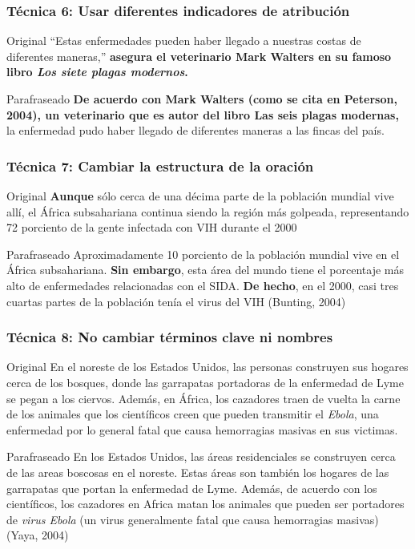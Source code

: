 \documentclass[
11pt, %
]{beamer}
\begin{document}
\begin{frame}
	\frametitle{Técnica 6: Usar diferentes indicadores de atribución}
	\begin{block}{Original}
		``Estas enfermedades pueden haber llegado a nuestras costas de diferentes maneras,'' \textbf{asegura el veterinario Mark Walters en su famoso libro \textit{Los siete plagas modernos}.}
	\end{block}
	\begin{block}{Parafraseado}
		\textbf{De acuerdo con Mark Walters (como se cita en Peterson, 2004), un veterinario que es autor del libro Las seis plagas modernas,} la enfermedad pudo haber llegado de diferentes maneras a las fincas del país.
	\end{block}
\end{frame}


\begin{frame}
	\frametitle{Técnica 7: Cambiar la estructura de la oración}
	\begin{block}{Original}
		\textbf{Aunque} sólo cerca de una décima parte de la población mundial vive allí, el África subsahariana continua siendo la región más golpeada, representando 72 porciento de la gente infectada con VIH durante el 2000
	\end{block}
	\begin{block}{Parafraseado}
		Aproximadamente 10 porciento de la población mundial vive en el África subsahariana. \textbf{Sin embargo}, esta área del mundo tiene el porcentaje más alto de enfermedades relacionadas con el SIDA. \textbf{De hecho}, en el 2000, casi tres cuartas partes de la población tenía el virus del VIH (Bunting, 2004)
	\end{block}
\end{frame}

\begin{frame}
	\frametitle{Técnica 8: No cambiar términos clave ni nombres}
	\begin{block}{Original}
		En el noreste de los Estados Unidos, las personas construyen sus hogares cerca de los bosques, donde las garrapatas portadoras de la enfermedad de Lyme se pegan a los ciervos. Además, en África, los cazadores traen de vuelta la carne de los animales que los científicos creen que pueden transmitir el \textit{Ebola}, una enfermedad por lo general fatal que causa hemorragias masivas en sus victimas.
	\end{block}
	\begin{block}{Parafraseado}
		En los Estados Unidos, las áreas residenciales se construyen cerca de las areas boscosas en el noreste. Estas áreas son también los hogares de las garrapatas que portan la enfermedad de Lyme. Además, de acuerdo con los científicos, los cazadores en Africa matan los animales que pueden ser portadores de \textit{virus Ebola} (un virus generalmente fatal que causa hemorragias masivas) (Yaya, 2004)
	\end{block}
\end{frame}
\end{document}
